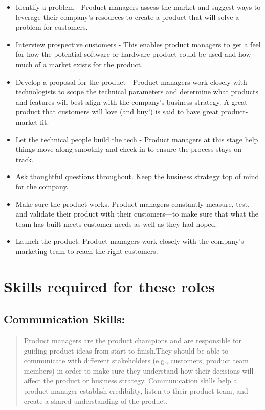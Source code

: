 \documentclass[
]{book}
\begin{document}
\begin{itemize}
\item
  Identify a problem - Product managers assess the market and suggest ways to leverage their company's resources to create a product that will solve a problem for customers.
\item
  Interview prospective customers - This enables product managers to get a feel for how the potential software or hardware product could be used and how much of a market exists for the product.
\item
  Develop a proposal for the product - Product managers work closely with technologists to scope the technical parameters and determine what products and features will best align with the company's business strategy. A great product that customers will love (and buy!) is said to have great product-market fit.
\item
  Let the technical people build the tech - Product managers at this stage help things move along smoothly and check in to ensure the process stays on track.
\item
  Ask thoughtful questions throughout. Keep the business strategy top of mind for the company.
\item
  Make sure the product works. Product managers constantly measure, test, and validate their product with their customers---to make sure that what the team has built meets customer needs as well as they had hoped.
\item
  Launch the product. Product managers work closely with the company's marketing team to reach the right customers.
\end{itemize}

\hypertarget{skills-required-for-these-roles-1}{%
\section*{Skills required for these roles}\label{skills-required-for-these-roles-1}}

\hypertarget{communication-skills}{%
\subsection*{Communication Skills:}\label{communication-skills}}

\begin{quote}
Product managers are the product champions and are responsible for guiding product ideas from start to finish.They should be able to communicate with different stakeholders (e.g., customers, product team members) in order to make sure they understand how their decisions will affect the product or business strategy. Communication skills help a product manager establish credibility, listen to their product team, and create a shared understanding of the product.
\end{quote}
\end{document}
